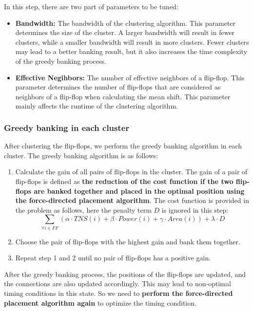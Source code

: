 \documentclass[12pt]{article}
\begin{document}
In this step, there are two part of parameters to be tuned:
\begin{itemize}
    \item \textbf{Bandwidth:} The bandwidth of the clustering algorithm. This parameter determines the size of the cluster. A larger bandwidth will result in fewer clusters, while a smaller bandwidth will result in more clusters. Fewer clusters may lead to a better banking result, but it also increases the time complexity of the greedy banking process.
    \item \textbf{Effective Negihbors:} The number of effective neighbors of a flip-flop. This parameter determines the number of flip-flops that are considered as neighbors of a flip-flop when calculating the mean shift. This parameter mainly affects the runtime of the clustering algorithm.
\end{itemize}

\subsubsection{Greedy banking in each cluster}

After clustering the flip-flops, we perform the greedy banking algorithm in each cluster. The greedy banking algorithm is as follows:

\begin{enumerate}
    \item Calculate the gain of all pairs of flip-flops in the cluster. The gain of a pair of flip-flops is defined as \textbf{the reduction of the cost function if the two flip-flops are banked together and placed in the optimal position using the force-directed placement algorithm}. The cost function is provided in the problem as follows, here the penalty term $D$ is ignored in this step:
    $$
    \sum_{\forall i \in FF}(\alpha \cdot TNS(i) + \beta \cdot Power(i) + \gamma \cdot Area(i)) + \lambda \cdot D
    $$
    \item Choose the pair of flip-flops with the highest gain and bank them together.
    \item Repeat step 1 and 2 until no pair of flip-flops has a positive gain.
\end{enumerate}


After the greedy banking process, the positions of the flip-flops are updated, and the connections are also updated accordingly. This may lead to non-optimal timing conditions in this state. So we need to \textbf{perform the force-directed placement algorithm again} to optimize the timing condition.
\end{document}
